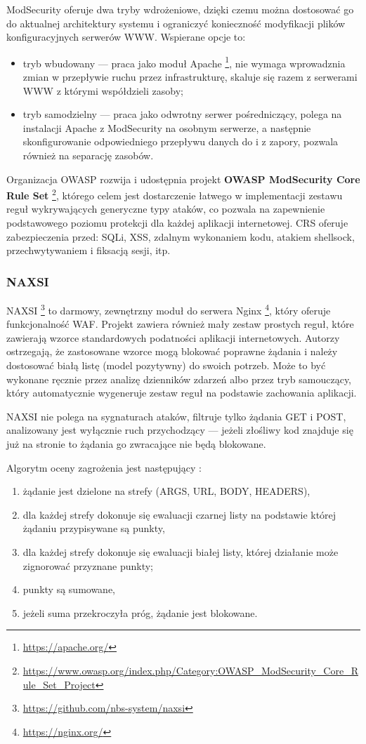 \documentclass[11pt,a4paper,polish,thesis]{dcsbook}
\begin{document}
ModSecurity oferuje dwa tryby wdrożeniowe, dzięki czemu można dostosować go do aktualnej architektury systemu i ograniczyć konieczność modyfikacji plików konfiguracyjnych serwerów WWW. Wspierane opcje to:
\begin{itemize}
\item tryb wbudowany --- praca jako moduł Apache \footnote{\url{https://apache.org/}}, nie wymaga wprowadznia zmian w przepływie ruchu przez infrastrukturę, skaluje się razem z serwerami WWW z którymi współdzieli zasoby;
\item tryb samodzielny --- praca jako odwrotny serwer pośredniczący, polega na instalacji Apache z ModSecurity na osobnym serwerze, a następnie skonfigurowanie odpowiedniego przepływu danych do i z zapory, pozwala również na separację zasobów.
\end{itemize}

Organizacja OWASP rozwija i udostępnia projekt \textbf{OWASP ModSecurity Core Rule Set} \footnote{\url{https://www.owasp.org/index.php/Category:OWASP_ModSecurity_Core_Rule_Set_Project}}, którego celem jest dostarczenie łatwego w implementacji zestawu reguł wykrywających generyczne typy ataków, co pozwala na zapewnienie podstawowego poziomu protekcji dla każdej aplikacji internetowej. CRS oferuje zabezpieczenia przed: SQLi, XSS, zdalnym wykonaniem kodu, atakiem shellsock, przechwytywaniem i fiksacją sesji, itp.

\subsubsection{NAXSI}
NAXSI \footnote{\url{https://github.com/nbs-system/naxsi}} to darmowy, zewnętrzny moduł do serwera Nginx \footnote{\url{https://nginx.org/}}, który oferuje funkcjonalność WAF. Projekt zawiera również mały zestaw prostych reguł, które zawierają wzorce standardowych podatności aplikacji internetowych. Autorzy ostrzegają, że zastosowane wzorce mogą blokować poprawne żądania i należy dostosować białą listę (model pozytywny) do swoich potrzeb. Może to być wykonane ręcznie przez analizę dzienników zdarzeń albo przez tryb samouczący, który automatycznie wygeneruje zestaw reguł na podstawie zachowania aplikacji.

NAXSI nie polega na sygnaturach ataków, filtruje tylko żądania GET i POST, analizowany jest wyłącznie ruch przychodzący --- jeżeli złośliwy kod znajduje się już na stronie to żądania go zwracające nie będą blokowane.

Algorytm oceny zagrożenia jest następujący \cite{naxsi-sekurak}:
\begin{enumerate}
\item żądanie jest dzielone na strefy (ARGS, URL, BODY, HEADERS),
\item dla każdej strefy dokonuje się ewaluacji czarnej listy na podstawie której żądaniu przypisywane są punkty,
\item dla każdej strefy dokonuje się ewaluacji białej listy, której działanie może zignorować przyznane punkty;
\item punkty są sumowane,
\item jeżeli suma przekroczyła próg, żądanie jest blokowane.
\end{enumerate}
\end{document}

